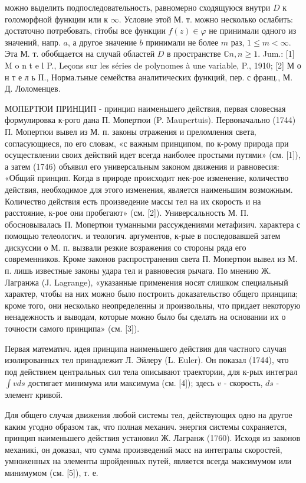 \documentclass[10pt]{article}
\begin{document}
можно выделить подпоследовательность, равномерно сходящуюся внутри $D$ к голоморфной функции или к $\infty$. Условие этой М. т. можно несколько ослабить: достаточно потребовать, гітобы все функции $f(z) \in \varphi$ не принимали одного из значений, напр. $a$, а другое значение $b$ принимали не более $m$ раз, $1 \leqslant m<\infty$. Эта М. т. обобщается на случай областей $D$ в пространстве $\mathbb{C} n, n \geqslant 1$. Jum.: [1] M o n t e l P., Leçons sur les séries de polynomes à une variable, P., 1910; [2] М о н т е л ь П., Норма.тьные семейства аналитических функций, пер. с франц., М. Д. Лоломенцев.



МОПЕРТЮИ ПРИНЦИП - принцип наименьшего действия, первая словесная формулировка к-рого дана П. Мопертюи (P. Maupertuis). Первоначально (1744) П. Мопертюи вывел из М. п. законы отражения и преломления света, согласующиеся, по его словам, «с важным принципом, по к-рому природа при осуществлении своих действий идет всегда наиболее простыми путями» (см. [1]), а затем (1746) объявил его универсальным законом движения и равновесия: «Общий принцип. Когда в природе происходит нек-рое изменение, количество действия, необходимое для этого изменения, является наименьшим возможным. Количество действия есть произведение массы тел на их скорость и на расстояние, к-рое они пробегают» (см. [2]). Универсальность М. П. обосновывалась П. Мопертюи туманными рассуждениями метафизич. характера с помощью телеологич. и теологич. аргументов, к-рые в последовавшей затем дискуссии о М. п. вызвали резкие возражения со стороны ряда его современников. Кроме законов распространения света П. Мопертюи вывел из М. п. лишь известные законы удара тел и равновесия рычага. По мнению Ж. Лагранжа (J. Lagrange), «указанные применения носят слишком специальный характер, чтобы на них можно было построить доказательство общего принципа; кроме того, они несколько неопределенны и произвольны, что придает некоторую ненадежность и выводам, которые можно было бы сделать на основании их о точности самого принципа» (см. [3]).



Первая математич. идея принципа наименьшего действия для частного случая изолированных тел принадлежит Л. Эйлеру (L. Euler). Он показал (1744), что под действием центральных сил тела описывают траектории, для к-рых интеграл $\int v d s$ достигает минимума или максимума (см. [4]); здесь $v$ - скорость, $d s$ - элемент кривой.



Для общего случая движения любой системы тел, действующих одно на другое каким угодно образом так, что полная механич. энергия системы сохраняется, принцип наименьшего действия установил Ж. Лагранж (1760). Исходя из законов механикі, он доказал, что сумма произведений масс на интегралы скоростей, умноженных на элементы шройденных путей, является всегда максимумом или минимумом (см. [5]), т. е.
\end{document}
